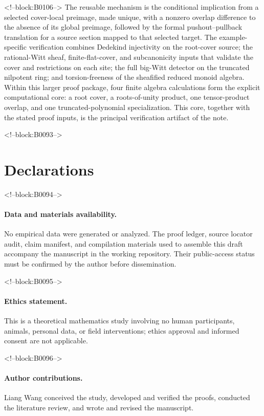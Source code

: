 \documentclass[11pt]{article}
\theoremstyle{definition}
\begin{document}
<!--block:B0106-->
The reusable mechanism is the conditional implication from a selected
cover-local preimage, made unique, with a nonzero overlap difference to
the absence of its global preimage, followed by the formal
pushout--pullback translation for a source section mapped to that selected
target.  The example-specific verification combines Dedekind injectivity on the
root-cover source; the rational-Witt sheaf, finite-flat-cover, and
subcanonicity inputs that validate the cover and restrictions on each site;
the full big-Witt detector on the truncated nilpotent ring; and
torsion-freeness of the sheafified reduced monoid algebra.  Within this larger proof package,
four finite algebra calculations form the explicit computational core: a
root cover, a roots-of-unity product, one tensor-product overlap, and one
truncated-polynomial specialization.  This core, together with the stated
proof inputs, is the principal verification artifact of the note.

<!--block:B0093-->
\section*{Declarations}

<!--block:B0094-->
\paragraph{Data and materials availability.}
No empirical data were generated or analyzed.  The proof ledger, source
locator audit, claim manifest, and compilation materials used to assemble
this draft accompany the manuscript in the working repository.  Their
public-access status must be confirmed by the author before dissemination.

<!--block:B0095-->
\paragraph{Ethics statement.}
This is a theoretical mathematics study involving no human participants,
animals, personal data, or field interventions; ethics approval and
informed consent are not applicable.

<!--block:B0096-->
\paragraph{Author contributions.}
Liang Wang conceived the study, developed and verified the proofs, conducted the literature review, and wrote and revised the manuscript.
\end{document}
